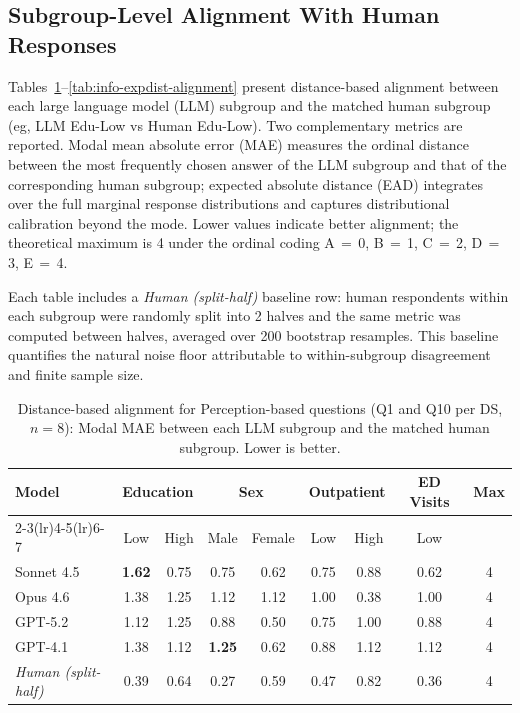 %

\subsection{Subgroup-Level Alignment With Human Responses}

Tables~\ref{tab:perc-distance-alignment}--\ref{tab:info-expdist-alignment} present
distance-based alignment between each large language model (LLM) subgroup and the
matched human subgroup (eg, LLM Edu-Low vs Human Edu-Low). Two complementary metrics
are reported. Modal mean absolute error (MAE) measures the ordinal distance between
the most frequently chosen answer of the LLM subgroup and that of the corresponding
human subgroup; expected absolute distance (EAD) integrates over the full marginal
response distributions and captures distributional calibration beyond the mode.
Lower values indicate better alignment; the theoretical maximum is 4 under the
ordinal coding A\,$=$\,0, B\,$=$\,1, C\,$=$\,2, D\,$=$\,3, E\,$=$\,4.

Each table includes a \emph{Human (split-half)} baseline row: human respondents
within each subgroup were randomly split into 2 halves and the same metric was
computed between halves, averaged over 200 bootstrap resamples. This baseline
quantifies the natural noise floor attributable to within-subgroup disagreement
and finite sample size.

\begin{table}[htbp]
\centering
\scriptsize
\setlength{\tabcolsep}{3.5pt}
\caption{Distance-based alignment for Perception-based questions (Q1 and Q10 per DS, $n{=}8$): Modal MAE between each LLM subgroup and the matched human subgroup. Lower is better.}
\label{tab:perc-distance-alignment}
\begin{tabular}{lcccccccc}
\toprule
\textbf{Model}
& \multicolumn{2}{c}{\textbf{Education}}
& \multicolumn{2}{c}{\textbf{Sex}}
& \multicolumn{2}{c}{\textbf{Outpatient}}
& \textbf{ED Visits}
& \textbf{Max} \\
\cmidrule(lr){2-3}\cmidrule(lr){4-5}\cmidrule(lr){6-7}
& Low & High & Male & Female & Low & High & Low & \\
\midrule
Sonnet 4.5 & \textbf{1.62} & 0.75 & 0.75 & 0.62 & 0.75 & 0.88 & 0.62 & 4 \\
Opus 4.6 & 1.38 & 1.25 & 1.12 & 1.12 & 1.00 & 0.38 & 1.00 & 4 \\
GPT-5.2 & 1.12 & 1.25 & 0.88 & 0.50 & 0.75 & 1.00 & 0.88 & 4 \\
GPT-4.1 & 1.38 & 1.12 & \textbf{1.25} & 0.62 & 0.88 & 1.12 & 1.12 & 4 \\
\midrule
\textit{Human (split-half)} & 0.39 & 0.64 & 0.27 & 0.59 & 0.47 & 0.82 & 0.36 & 4 \\
\bottomrule
\end{tabular}
\end{table}

